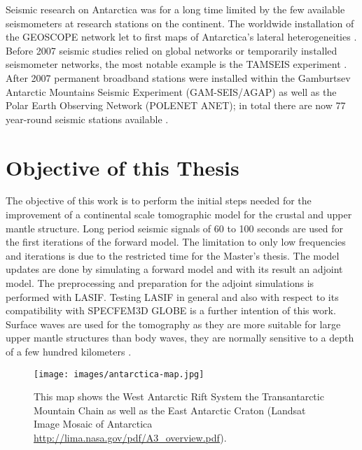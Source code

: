Seismic research on Antarctica was for a long time limited by the few available seismometers at research stations on the continent. 
The worldwide installation of the GEOSCOPE network let to first maps of Antarctica's lateral heterogeneities \citep{Roult1994}.
Before 2007 seismic studies relied on global networks or temporarily installed seismometer networks, the most notable
example is the TAMSEIS experiment \citep{Lawrence2006}. 
After 2007 permanent broadband stations were installed within the Gamburtsev Antarctic Mountains Seismic Experiment (GAM-SEIS/AGAP)
as well as the Polar Earth Observing Network (POLENET ANET); 
in total there are now 77 year-round seismic stations available \citep{Anthony2014}.  


\section{Objective of this Thesis} %

The objective of this work is to perform the initial steps needed for the improvement of a continental scale tomographic model for the crustal and upper mantle structure.
Long period seismic signals of 60 to 100 seconds %
are used for the first iterations of the forward model. 
The limitation to only low frequencies and %
iterations is due to the restricted time for the Master's thesis.
The model updates are done by simulating a forward model and with its result an adjoint model. %
The preprocessing and preparation for the adjoint simulations is performed with LASIF. 
Testing LASIF in general and also with respect to its compatibility with SPECFEM3D GLOBE is a further intention of this work.
Surface waves are used for the tomography as they are more suitable for large upper mantle structures than body waves, 
they are normally sensitive to a depth of a few hundred kilometers \citep{Morelli2004}.

 


\begin{figure}[H]
\begin{center}
\texttt{[image: images/antarctica-map.jpg]}
\caption{This map shows the West Antarctic Rift System the Transantarctic Mountain Chain as well as the East Antarctic Craton 
(Landsat Image Mosaic of Antarctica \url{http://lima.nasa.gov/pdf/A3_overview.pdf}).}
\label{ant-map}
\end{center}
\end{figure}